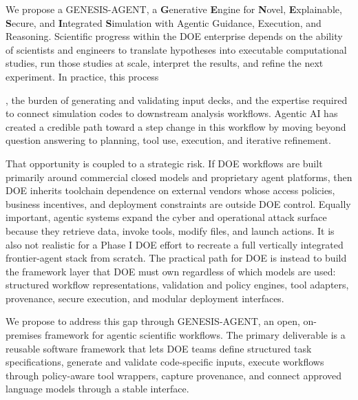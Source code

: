 \documentclass[11pt]{article} \usepackage[margin=1in]{geometry}
\begin{document}
%
 

 
 


We propose a GENESIS-AGENT, a \textbf{G}enerative \textbf{E}ngine for
\textbf{N}ovel, \textbf{E}xplainable, \textbf{S}ecure, and \textbf{I}ntegrated
\textbf{S}imulation with Agentic Guidance, Execution, and Reasoning. Scientific
progress within the DOE enterprise depends on the ability of scientists and
engineers to translate hypotheses into executable computational studies, run
those studies at scale, interpret the results, and refine the next experiment.
In practice, this process 

, the burden of generating and validating input decks, and the expertise
required to connect simulation codes to downstream analysis workflows. Agentic
AI has created a credible path toward a step change in this workflow by moving
beyond question answering to planning, tool use, execution, and iterative
refinement.

That opportunity is coupled to a strategic risk. If DOE workflows are built
primarily around commercial closed models and proprietary agent platforms, then
DOE inherits toolchain dependence on external vendors whose access policies,
business incentives, and deployment constraints are outside DOE control. Equally
important, agentic systems expand the cyber and operational attack surface
because they retrieve data, invoke tools, modify files, and launch actions. It
is also not realistic for a Phase I DOE effort to recreate a full vertically
integrated frontier-agent stack from scratch. The practical path for DOE is
instead to build the framework layer that DOE must own regardless of which
models are used: structured workflow representations, validation and policy
engines, tool adapters, provenance, secure execution, and modular deployment
interfaces.

We propose to address this gap through GENESIS-AGENT, an open, on-premises
framework for agentic scientific workflows. The primary deliverable is a
reusable software framework that lets DOE teams define structured task
specifications, generate and validate code-specific inputs, execute workflows
through policy-aware tool wrappers, capture provenance, and connect approved
language models through a stable interface.
\end{document}
